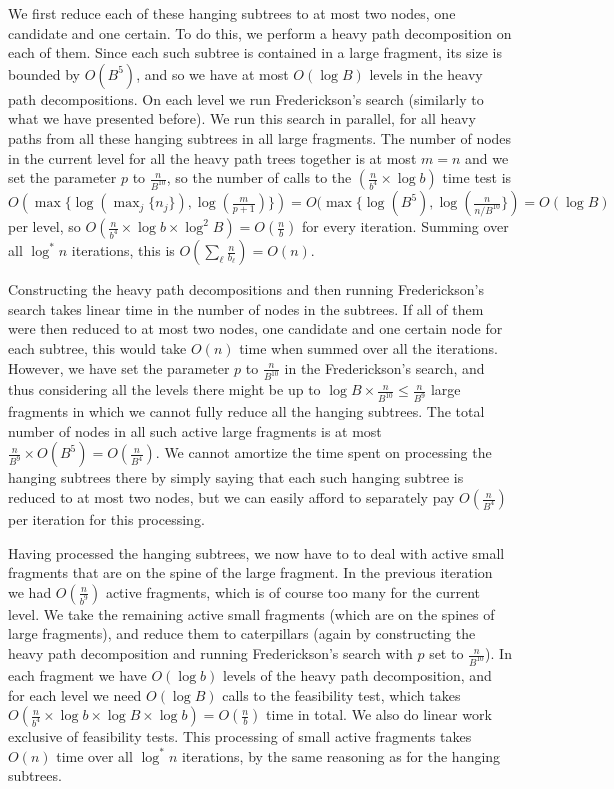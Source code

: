 \documentclass[11pt,a4paper]{article}
\theoremstyle{definition}
\theoremstyle{remark}
\begin{document}
We first reduce each of these hanging subtrees to at most two nodes, one candidate and one certain. To do this, we 
perform a heavy path decomposition on each of them. Since each such subtree is contained in a large fragment, its 
size is bounded by $O(B^5)$, and so we have at most $O(\log B)$ levels in the heavy 
path decompositions. On each level we run Frederickson's search (similarly to what we have presented before).
We run this search in parallel, for all heavy paths from all these hanging subtrees in all large fragments.
The number of  nodes in the current level for all the heavy path trees together is at most $m=n$ and we set
the parameter $p$ to $\frac{n}{B^{10}}$, so the number of calls to the $(\frac{n}{b^4} \times \log b)$ time test
is $O(\max \lbrace \log(\max_{j} \lbrace n_j \rbrace), \log(\frac{m}{p+1}) \rbrace) = O(\max \lbrace \log (B^{5}), \log(\frac{n}{n/B^{10}} \rbrace) = O(\log B)$ per level, so
$O(\frac{n}{b^4} \times \log b \times \log^{2} B) = O(\frac{n}{b})$ for every iteration.
Summing over all $\log^{*}n$ iterations, this is $O(\sum_{\ell}\frac{n}{b_\ell}) = O(n)$.

Constructing the heavy path decompositions and then running Frederickson's search takes linear time in the number
of nodes in the subtrees. If all of them were then reduced to at most two nodes, one candidate and one certain
node for each subtree, this would take $O(n)$ time when summed over all the iterations. However, we have set
the parameter $p$ to $\frac{n}{B^{10}}$ in the Frederickson's search, and thus considering all the levels there
might be up to $\log B\times\frac{n}{B^{10}}\leq \frac{n}{B^{9}}$ large fragments in which we cannot fully reduce
all the hanging subtrees. The total number of nodes in all such active large fragments is at most
$\frac{n}{B^9} \times O(B^5) = O(\frac{n}{B^{4}})$. We cannot amortize the time spent on processing the hanging
subtrees there by simply saying that each such hanging subtree is reduced to at most
two nodes, but we can easily afford to separately pay $O(\frac{n}{B^{4}})$ per iteration for this processing.

Having processed the hanging subtrees, we now have to to deal with active small fragments that are on the spine
of the large fragment. In the previous iteration we had $O(\frac{n}{b^9})$ active fragments, which is of course
too many for the current level. We take the remaining active small fragments (which are on the spines of large 
fragments), and reduce them to caterpillars (again by constructing the heavy path decomposition and running
Frederickson's search with $p$ set to $\frac{n}{B^{10}}$). In each fragment we have $O(\log b)$ levels of the heavy
path decomposition, and for each level we need $O(\log B)$ calls to the feasibility test, which takes
$O(\frac{n}{b^4} \times \log b \times \log B \times \log b) = O(\frac{n}{b})$ time in total. We also do linear
work exclusive of feasibility tests. This processing of small active fragments takes $O(n)$ time over all
$\log ^*n$ iterations, by the same reasoning as for the hanging subtrees.
\end{document}
